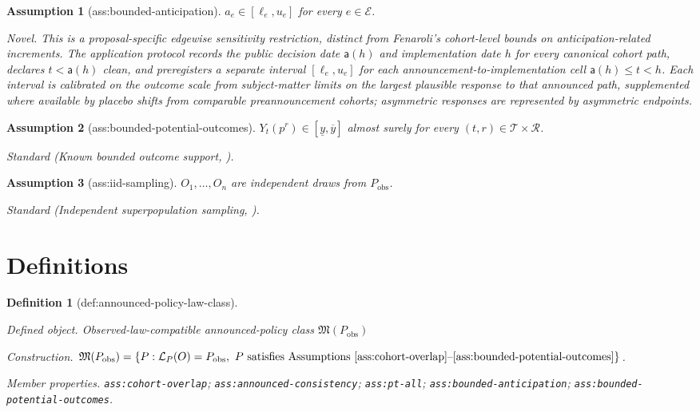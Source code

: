 \documentclass{article}
\newtheorem{assumption}{Assumption}
\newtheorem{definition}{Definition}
\begin{document}
\begin{assumption}[ass:bounded-anticipation]\label{ass:bounded-anticipation}
\(a_e\in[\ell_e,u_e]\) for every \(e\in\mathcal E\).
\par\smallskip\noindent\emph{Novel.} This is a proposal-specific edgewise sensitivity restriction, distinct from Fenaroli's cohort-level bounds on anticipation-related increments. The application protocol records the public decision date \(\mathsf a(h)\) and implementation date \(h\) for every canonical cohort path, declares \(t<\mathsf a(h)\) clean, and preregisters a separate interval \([\ell_e,u_e]\) for each announcement-to-implementation cell \(\mathsf a(h)\le t<h\). Each interval is calibrated on the outcome scale from subject-matter limits on the largest plausible response to that announced path, supplemented where available by placebo shifts from comparable preannouncement cohorts; asymmetric responses are represented by asymmetric endpoints.
\end{assumption}

\begin{assumption}[ass:bounded-potential-outcomes]\label{ass:bounded-potential-outcomes}
\(Y_t(p^r)\in[\underline y,\overline y]\) almost surely for every \((t,r)\in\mathcal T\times\mathcal R\).
\par\smallskip\noindent\emph{Standard} (Known bounded outcome support, \cite{Manski2003}).
\end{assumption}

\begin{assumption}[ass:iid-sampling]\label{ass:iid-sampling}
\(O_1,\ldots,O_n\) are independent draws from \(P_{\mathrm{obs}}\).
\par\smallskip\noindent\emph{Standard} (Independent superpopulation sampling, \cite{CallawaySantAnna2021}).
\end{assumption}

\section{Definitions}

\begin{definition}[def:announced-policy-law-class]\label{def:announced-policy-law-class}
\par\smallskip\noindent\emph{Defined object.} Observed-law-compatible announced-policy class \(\mathfrak M(P_{\mathrm{obs}})\)
\par\smallskip\noindent\emph{Construction.} \(\mathfrak M(P_{\mathrm{obs}})=\{P:\mathcal L_P(O)=P_{\mathrm{obs}},\ P\text{ satisfies Assumptions }\ref{ass:cohort-overlap}\text{--}\ref{ass:bounded-potential-outcomes}\}\).
\par\smallskip\noindent\emph{Member properties.} \texttt{ass:\allowbreak{}cohort-\allowbreak{}overlap}; \texttt{ass:\allowbreak{}announced-\allowbreak{}consistency}; \texttt{ass:\allowbreak{}pt-\allowbreak{}all}; \texttt{ass:\allowbreak{}bounded-\allowbreak{}anticipation}; \texttt{ass:\allowbreak{}bounded-\allowbreak{}potential-\allowbreak{}outcomes}.
\end{definition}
\end{document}
